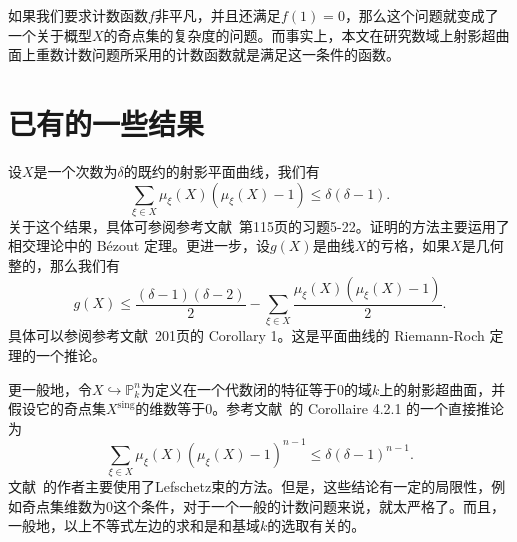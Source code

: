 如果我们要求计数函数$f$非平凡，并且还满足$f(1) = 0$，那么这个问题就变成了一个关于概型$X$的奇点集的复杂度的问题。而事实上，本文在研究数域上射影超曲面上重数计数问题所采用的计数函数就是满足这一条件的函数。


\section{已有的一些结果}
设$X$是一个次数为$\delta$的既约的射影平面曲线，我们有
\begin{equation} \label{intro-fulton-multiplicity}
\sum\limits_{\xi\in X} \mu_{\xi}(X) \left(\mu_{\xi}(X)-1\right) \leqslant \delta(\delta-1).
\end{equation}
关于这个结果，具体可参阅参考文献~第115页的习题5-22。证明的方法主要运用了相交理论中的 B\'ezout 定理。更进一步，设$g(X)$是曲线$X$的亏格，如果$X$是几何整的，那么我们有
\begin{equation}
g(X) \leqslant \dfrac{(\delta-1)(\delta-2)}{2} - \sum_{\xi \in X} \dfrac{\mu_{\xi}(X)\left(\mu_{\xi}(X)-1\right)}{2}.
\end{equation}
具体可以参阅参考文献~201页的 Corollary 1。这是平面曲线的 Riemann-Roch 定理的一个推论。

更一般地，令$X \hookrightarrow \mathbb{P}^n_k$为定义在一个代数闭的特征等于$0$的域$k$上的射影超曲面，并假设它的奇点集$X^{\mathrm{sing}}$的维数等于$0$。参考文献~的 Corollaire 4.2.1 的一个直接推论为
\begin{equation}
\sum_{\xi\in X} \mu_\xi(X)(\mu_{\xi}(X)-1)^{n-1} \leqslant \delta(\delta-1)^{n-1}.
\end{equation}
文献~的作者主要使用了Lefschetz束的方法。但是，这些结论有一定的局限性，例如奇点集维数为0这个条件，对于一个一般的计数问题来说，就太严格了。而且，一般地，以上不等式左边的求和是和基域$k$的选取有关的。

